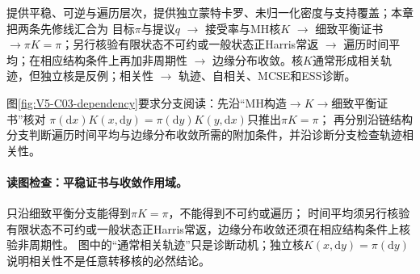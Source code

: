 \begin{SLCompactOpeningSection}
\label{struct:V5-C03-CH04}
\begin{dependencybox}
提供平稳、可逆与遍历层次，提供独立蒙特卡罗、未归一化密度与支持覆盖；本章把两条先修线汇合为
目标$\pi$与提议$q$
$\to$ 接受率与MH核$K$
$\to$ 细致平衡证书
$\to \pi K=\pi$；另行核验有限状态不可约或一般状态正Harris常返
$\to$ 遍历时间平均；在相应结构条件上再加非周期性
$\to$ 边缘分布收敛。核$K$通常形成相关轨迹，但独立核是反例；相关性
$\to$ 轨迹、自相关、MCSE和ESS诊断。
\end{dependencybox}
图\ref{fig:V5-C03-dependency}要求分支阅读：先沿“MH构造$\to K\to$细致平衡证书”核对
$\pi(\mathrm dx)K(x,\mathrm dy)=\pi(\mathrm dy)K(y,\mathrm dx)$只推出$\pi K=\pi$；
再分别沿链结构分支判断遍历时间平均与边缘分布收敛所需的附加条件，并沿诊断分支检查轨迹相关性。

\FloatBarrier
\paragraph{读图检查：平稳证书与收敛作用域。}只沿细致平衡分支能得到$\pi K=\pi$，不能得到不可约或遍历；
时间平均须另行核验有限状态不可约或一般状态正Harris常返，边缘分布收敛还须在相应结构条件上核验非周期性。
图中的“通常相关轨迹”只是诊断动机；独立核$K(x,\mathrm dy)=\pi(\mathrm dy)$说明相关性不是任意转移核的必然结论。\par
\end{SLCompactOpeningSection}

